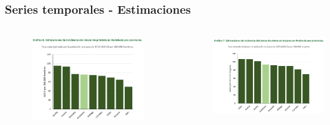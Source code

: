 \documentclass{beamer}
\begin{document}
\begin{frame}
\begin{columns}
\begin{column}{0.5\textwidth}
\begin{figure}
			\end{figure}
		\end{column}
	\end{columns}
\end{frame}


\begin{frame}\frametitle{Series temporales - Estimaciones}
	\begin{columns}
		\begin{column}{0.5\textwidth}
			\begin{figure}
				\centering
				\includegraphics[width=.98\textwidth]{images/estimaciones_hombres2.png}
			\end{figure}
		\end{column}
		\begin{column}{0.5\textwidth}
			\begin{figure}
				\centering
				\includegraphics[width=1.02\textwidth]{images/estimaciones_mujeres2.png}
			\end{figure}
		\end{column}
	\end{columns}
\end{frame}
\end{document}
